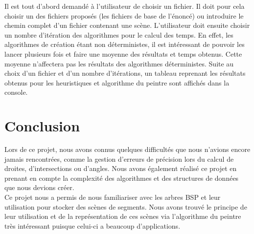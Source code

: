 \documentclass[11pt,a4paper]{article}
\theoremstyle{definition}
\theoremstyle{remark}
\begin{document}
Il est tout d'abord demandé à l'utilisateur de choisir un fichier. Il doit pour cela choisir un des fichiers proposés (les fichiers de base de l'énoncé) ou introduire le chemin complet d'un fichier contenant une scène. L'utilisateur doit ensuite choisir un nombre d'itération des algorithmes pour le calcul des temps. En effet, les algorithmes de création étant non déterministes, il est intéressant de pouvoir les lancer plusieurs fois et faire une moyenne des résultats et temps obtenus. Cette moyenne n'affectera pas les résultats des algorithmes déterministes. Suite au choix d'un fichier et d'un nombre d'itérations, un tableau reprenant les résultats obtenus pour les heuristiques et algorithme du peintre sont affichés dans la console.

\section*{Conclusion}
Lors de ce projet, nous avons connus quelques difficultés que nous n'avions encore jamais rencontrées, comme la gestion d'erreurs de précision lors du calcul de droites, d'intersections ou d'angles. Nous avons également réalisé ce projet en prenant en compte la complexité des algorithmes et des structures de données que nous devions créer.\\

Ce projet nous a permis de nous familiariser avec les arbres BSP et leur utilisation pour stocker des scènes de segments. Nous avons trouvé le principe de leur utilisation et de la représentation de ces scènes via l'algorithme du peintre très intéressant puisque celui-ci a beaucoup d'applications. 
\end{document}
